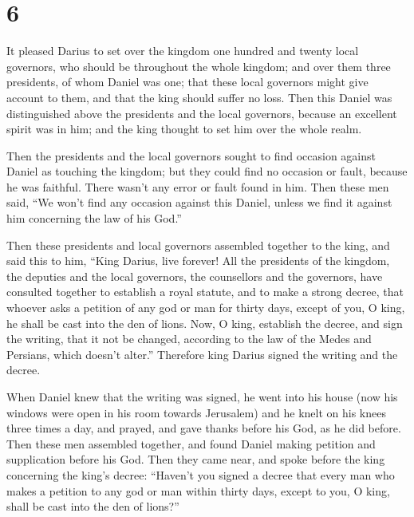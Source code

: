\hypertarget{section-5}{%
\section{6}\label{section-5}}

 It pleased Darius to set over the kingdom one hundred and
twenty local governors, who should be throughout the whole kingdom;
 and over them three presidents, of whom Daniel was one;
that these local governors might give account to them, and that the king
should suffer no loss.  Then this Daniel was distinguished
above the presidents and the local governors, because an excellent
spirit was in him; and the king thought to set him over the whole realm.

 Then the presidents and the local governors sought to find
occasion against Daniel as touching the kingdom; but they could find no
occasion or fault, because he was faithful. There wasn't any error or
fault found in him.  Then these men said, ``We won't find
any occasion against this Daniel, unless we find it against him
concerning the law of his God.''

 Then these presidents and local governors assembled
together to the king, and said this to him, ``King Darius, live forever!
 All the presidents of the kingdom, the deputies and the
local governors, the counsellors and the governors, have consulted
together to establish a royal statute, and to make a strong decree, that
whoever asks a petition of any god or man for thirty days, except of
you, O king, he shall be cast into the den of lions.  Now, O
king, establish the decree, and sign the writing, that it not be
changed, according to the law of the Medes and Persians, which doesn't
alter.''  Therefore king Darius signed the writing and the
decree.

 When Daniel knew that the writing was signed, he went into
his house (now his windows were open in his room towards Jerusalem) and
he knelt on his knees three times a day, and prayed, and gave thanks
before his God, as he did before.  Then these men assembled
together, and found Daniel making petition and supplication before his
God.  Then they came near, and spoke before the king
concerning the king's decree: ``Haven't you signed a decree that every
man who makes a petition to any god or man within thirty days, except to
you, O king, shall be cast into the den of lions?''

